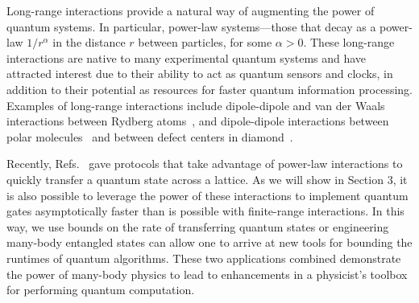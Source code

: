 Long-range interactions provide a natural way of augmenting the power of quantum systems.
In particular, power-law systems---those that decay as a power-law $1/r^\alpha$ in the distance  $r$ between particles, for some $\alpha > 0$.
These long-range interactions are native to many experimental quantum systems and have attracted interest due to their ability to act as quantum sensors and clocks, in addition to their potential as resources for faster quantum information processing. Examples of long-range interactions include dipole-dipole and van der Waals interactions between Rydberg atoms~\cite{Saffman2010,Weimer2012}, and dipole-dipole interactions between polar molecules~\cite{Yan2013} and between defect centers in diamond~\cite{Yao2012,Weimer2012}.

Recently, Refs.~\cite{Eldredge2017,Guo2020,Tran2021a,kuwaharaStrictlyLinearLight2020} gave protocols that take advantage of power-law interactions to quickly transfer a quantum state across a lattice.
As we will show in Section 3, it is also possible to leverage the power of these interactions to implement quantum gates asymptotically faster than is possible with finite-range interactions.
In this way, we use bounds on the rate of transferring quantum states or engineering many-body entangled states can allow one to arrive at new tools for bounding the runtimes of quantum algorithms.
These two applications combined demonstrate the power of many-body physics to lead to enhancements in a physicist's toolbox for performing quantum computation.

